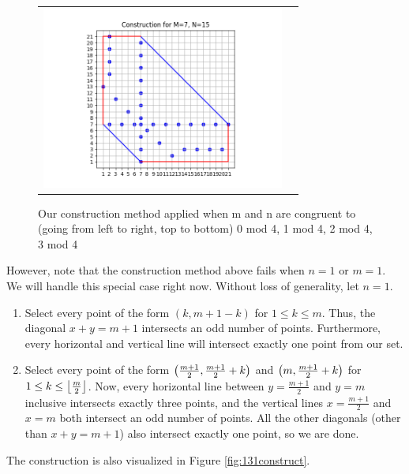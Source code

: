 \documentclass[10pt]{../usamts}
\begin{document}
\begin{solution}
\begin{figure}[htbp]
\begin{tabular}{c c}
    \includegraphics[width=8cm]{round2/p5construct/construct_7_15.png}\\
    \end{tabular}
    \caption{Our construction method applied when m and n are congruent to (going from left to right, top to bottom) 0 mod 4, 1 mod 4, 2 mod 4, 3 mod 4}
    \label{fig:congconstruct}
\end{figure}

\clearpage

However, note that the construction method above fails when $n=1$ or $m=1$. We will handle this special case right now. Without loss of generality, let $n=1$.

\begin{enumerate}
    \item Select every point of the form $(k,m+1-k)$ for $1 \le k \le m$. Thus, the diagonal $x+y=m+1$ intersects an odd number of points. Furthermore, every horizontal and vertical line will intersect exactly one point from our set.
    \item Select every point of the form $\left( \frac{m+1}{2}, \frac{m+1}{2}+k \right)$ and $\left( m, \frac{m+1}{2}+k \right)$ for $1 \le k \le \left\lfloor \frac{m}{2} \right\rfloor$. Now, every horizontal line between $y=\frac{m+1}{2}$ and $y=m$ inclusive intersects exactly three points, and the vertical lines $x=\frac{m+1}{2}$ and $x=m$ both intersect an odd number of points. All the other diagonals (other than $x+y=m+1$) also intersect exactly one point, so we are done.
\end{enumerate}

The construction is also visualized in Figure \ref{fig:131construct}.


\end{solution}
\end{document}
